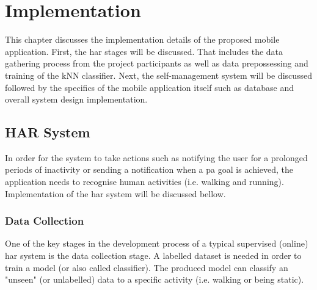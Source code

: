 \chapter{Implementation}
\label{chapter:implementation}
This chapter discusses the implementation details of the proposed mobile application. First, the \gls{har} stages will be discussed. That includes the data gathering process from the project participants as well as data prepossessing and training of the kNN classifier. Next, the self-management system will be discussed followed by the specifics of the mobile application itself such as database and overall system design implementation.

\section{HAR System}
In order for the system to take actions such as notifying the user for a prolonged periods of inactivity or sending a notification when a \gls{pa} goal is achieved, the application needs to recognise human activities (i.e. walking and running). Implementation of the \gls{har} system will be discussed bellow.

    \subsection{Data Collection}
    One of the key stages in the development process of a typical supervised (online) \gls{har} system is the data collection stage. A labelled dataset is needed in order to train a model (or also called classifier). The produced model can classify an "unseen" (or unlabelled) data to a specific activity (i.e. walking or being static).
    
